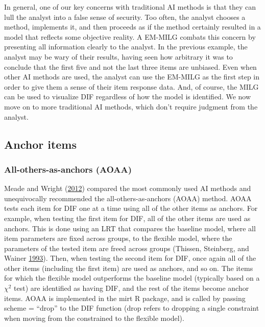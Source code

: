 \documentclass[
  11pt,
]{article}
\begin{document}
In general, one of our key concerns with traditional AI methods is that they can lull the analyst into a false sense of security. Too often, the analyst chooses a method, implements it, and then proceeds as if the method certainly resulted in a model that reflects some objective reality. A EM-MILG combats this concern by presenting all information clearly to the analyst. In the previous example, the analyst may be wary of their results, having seen how arbitrary it was to conclude that the first five and not the last three items are unbiased. Even when other AI methods are used, the analyst can use the EM-MILG as the first step in order to give them a sense of their item response data. And, of course, the MILG can be used to visualize DIF regardless of how the model is identified. We now move on to more traditional AI methods, which don't require judgment from the analyst.

\hypertarget{anchoritems}{%
\subsection{Anchor items}\label{anchoritems}}

\hypertarget{all-others-as-anchors-aoaa}{%
\subsubsection{All-others-as-anchors (AOAA)}\label{all-others-as-anchors-aoaa}}

Meade and Wright (\protect\hyperlink{ref-meade2012solving}{2012}) compared the most commonly used AI methods and unequivocally recommended the all-others-as-anchors (AOAA) method. AOAA tests each item for DIF one at a time using all of the other items as anchors. For example, when testing the first item for DIF, all of the other items are used as anchors. This is done using an LRT that compares the baseline model, where all item parameters are fixed across groups, to the flexible model, where the parameters of the tested item are freed across groups (Thissen, Steinberg, and Wainer \protect\hyperlink{ref-thissen1993detection}{1993}). Then, when testing the second item for DIF, once again all of the other items (including the first item) are used as anchors, and so on. The items for which the flexible model outperforms the baseline model (typically based on a \(\chi^2\) test) are identified as having DIF, and the rest of the items become anchor items. AOAA is implemented in the mirt R package, and is called by passing scheme = \enquote{drop} to the DIF function (drop refers to dropping a single constraint when moving from the constrained to the flexible model).
\end{document}
